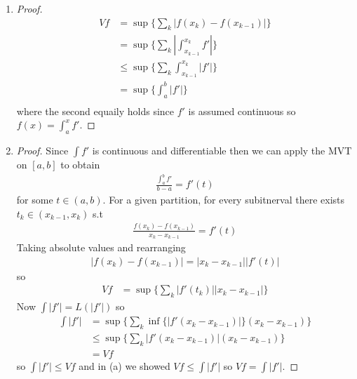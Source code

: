 \begin{enumerate}[label=(\alph*)]
    \item 
    \begin{proof}
        \begin{align*}
            Vf &= \sup\{ \sum_k |f(x_k) - f(x_{k-1})|\} \\
            &= \sup\{ \sum_k |\int_{x_{k-1}}^{x_k} f'|\} \\ 
            &\leq \sup\{ \sum_k \int_{x_{k-1}}^{x_k} |f'|\} \\ 
            &= \sup\{ \int_{a}^{b} |f'|\} \\ 
        \end{align*}
        where the second equaily holds since $f'$ is assumed continuous
        so $f(x)=\int_a^x f'$.
    \end{proof}

    \item
    \begin{proof}
        Since $\int f'$ is continuous and differentiable then we can apply 
        the MVT on $[a,b]$ to obtain
        \begin{align*}
            \frac{\int_a^b f'}{b-a} = f'(t)
        \end{align*}
        for some $t\in(a,b)$. For a given partition, for every subitnerval 
        there exists $t_k\in(x_{{k-1}},x_k)$ s.t 
        \begin{align*}
            \frac{f(x_k)-f(x_{k-1})}{x_k-x_{{k-1}}} = f'(t)
        \end{align*}
        Taking absolute values and rearranging
        \begin{align*}
            |f(x_k)-f(x_{k-1})| = |x_k-x_{{k-1}}||f'(t)|
        \end{align*}
        so 
        \begin{align*}
            Vf &= \sup\{ \sum_k |f'(t_k)||x_k-x_{{k-1}}|\}
        \end{align*}
        Now $\int |f'| = L(|f'|)$ so 
        \begin{align*}
            \int |f'| &= \sup\{ \sum_k \inf\{ |f'(x_k-x_{{k-1}})| \}(x_k-x_{{k-1}})\} \\
            &\leq \sup\{ \sum_k |f'(x_k-x_{{k-1}})| (x_k-x_{{k-1}})\} \\
            &= Vf
        \end{align*}
        so $\int |f'|\leq Vf$ and in (a) we showed $Vf \leq \int |f'|$ so $Vf = \int |f'|$.
    \end{proof}
\end{enumerate}

